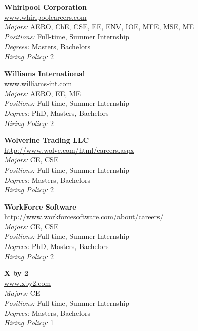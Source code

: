\documentclass[twoside]{article}
\begin{document}
\begin{center}
\begin{multicols}{3}
\begin{minipage}{.9\columnwidth}{\Large\bf Whirlpool Corporation }\\
	\url{www.whirlpoolcareers.com}\\
	\emph{Majors:} AERO, ChE, CSE, EE, ENV, IOE, MFE, MSE, ME\\
	\emph{Positions:} Full-time, Summer Internship\\
	\emph{Degrees:} Masters, Bachelors\\
	\emph{Hiring Policy:} 2\\
\end{minipage}
 
\begin{minipage}{.9\columnwidth}{\Large\bf Williams International }\\
	\url{www.williams-int.com}\\
	\emph{Majors:} AERO, EE, ME\\
	\emph{Positions:} Full-time, Summer Internship\\
	\emph{Degrees:} PhD, Masters, Bachelors\\
	\emph{Hiring Policy:} 2\\
\end{minipage}
 
\begin{minipage}{.9\columnwidth}{\Large\bf Wolverine Trading LLC }\\
	\url{http://www.wolve.com/html/careers.aspx}\\
	\emph{Majors:} CE, CSE\\
	\emph{Positions:} Full-time, Summer Internship\\
	\emph{Degrees:} Masters, Bachelors\\
	\emph{Hiring Policy:} 2\\
\end{minipage}
 
\begin{minipage}{.9\columnwidth}{\Large\bf WorkForce Software }\\
	\url{http://www.workforcesoftware.com/about/careers/}\\
	\emph{Majors:} CE, CSE\\
	\emph{Positions:} Full-time, Summer Internship\\
	\emph{Degrees:} PhD, Masters, Bachelors\\
	\emph{Hiring Policy:} 2\\
\end{minipage}
 
\begin{minipage}{.9\columnwidth}{\Large\bf X by 2 }\\
	\url{www.xby2.com}\\
	\emph{Majors:} CE\\
	\emph{Positions:} Full-time, Summer Internship\\
	\emph{Degrees:} Masters, Bachelors\\
	\emph{Hiring Policy:} 1\\
\end{minipage}
 

\end{multicols}
\end{center}
\end{document}
